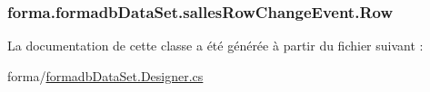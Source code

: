 \subsubsection[{\texorpdfstring{Row}{Row}}]{ forma.\+formadb\+Data\+Set.\+salles\+Row\+Change\+Event.\+Row\hspace{0.3cm}{\ttfamily [get]}}\hypertarget{classforma_1_1formadb_data_set_1_1salles_row_change_event_a9bfda47fe20d5bb0ddb990d2acc61bf6}{}\label{classforma_1_1formadb_data_set_1_1salles_row_change_event_a9bfda47fe20d5bb0ddb990d2acc61bf6}


La documentation de cette classe a été générée à partir du fichier suivant \+:\begin{DoxyCompactItemize}
\item 
forma/\hyperlink{formadb_data_set_8_designer_8cs}{formadb\+Data\+Set.\+Designer.\+cs}\end{DoxyCompactItemize}
